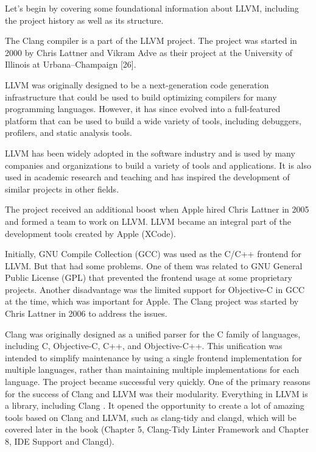 Let’s begin by covering some foundational information about LLVM, including the project history as well as its structure.




The Clang compiler is a part of the LLVM project. The project was started in 2000 by Chris Lattner and Vikram Adve as their project at the University of Illinois at Urbana–Champaign [26].

LLVM was originally designed to be a next-generation code generation infrastructure that could be used to build optimizing compilers for many programming languages. However, it has since evolved into a full-featured platform that can be used to build a wide variety of tools, including debuggers, profilers, and static analysis tools.

LLVM has been widely adopted in the software industry and is used by many companies and organizations to build a variety of tools and applications. It is also used in academic research and teaching and has inspired the development of similar projects in other fields.

The project received an additional boost when Apple hired Chris Lattner in 2005 and formed a team to work on LLVM. LLVM became an integral part of the development tools created by Apple (XCode).

Initially, GNU Compile Collection (GCC) was used as the C/C++ frontend for LLVM. But that had some problems. One of them was related to GNU General Public License (GPL) that prevented the frontend usage at some proprietary projects. Another disadvantage was the limited support for Objective-C in GCC at the time, which was important for Apple. The Clang project was started by Chris Lattner in 2006 to address the issues.

Clang was originally designed as a unified parser for the C family of languages, including C, Objective-C, C++, and Objective-C++. This unification was intended to simplify maintenance by using a single frontend implementation for multiple languages, rather than maintaining multiple implementations for each language. The project became successful very quickly. One of the primary reasons for the success of Clang and LLVM was their modularity. Everything in LLVM is a library, including Clang . It opened the opportunity to create a lot of amazing tools based on Clang and LLVM, such as clang-tidy and clangd, which will be covered later in the book (Chapter 5, Clang-Tidy Linter Framework and Chapter 8, IDE Support and Clangd).

